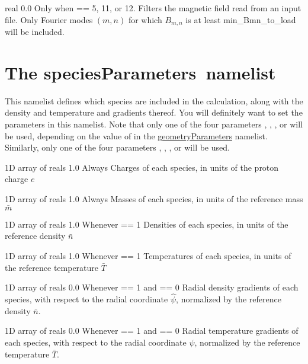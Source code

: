 {real}
{0.0}
{Only when  == 5, 11, or 12.}
{Filters the magnetic field read from an input file.  Only Fourier modes $(m,n)$ for which $B_{m,n}$ is at least {\ttfamily min\_Bmn\_to\_load} will be included.}




\section{The {\ttfamily speciesParameters}~namelist}

This namelist defines which species are included in the calculation, along with the density and temperature and gradients thereof.
You will definitely want to set the parameters in this namelist.
Note that only one of the four parameters 
, 
, 
, or
will be used, depending on the value of 
in the {\ttfamily \hyperref[sec:geometryParameters]{geometryParameters}} namelist.
Similarly, only one of the four parameters
, 
, 
, or
will be used.

\myhrule

{1D array of reals}
{1.0}
{Always}
{Charges of each species, in units of the proton charge $e$}

\myhrule

{1D array of reals}
{1.0}
{Always}
{Masses of each species, in units of the reference mass $\bar{m}$}

\myhrule

{1D array of reals}
{1.0}
{Whenever  == 1}
{Densities of each species, in units of the reference density $\bar{n}$}

\myhrule

{1D array of reals}
{1.0}
{Whenever  == 1}
{Temperatures of each species, in units of the reference temperature $\bar{T}$}

\myhrule

{1D array of reals}
{0.0}
{Whenever  == 1 and  == 0}
{Radial density gradients of each species, with respect to the radial coordinate $\hat{\psi}$, normalized by the reference density $\bar{n}$.}

\myhrule

{1D array of reals}
{0.0}
{Whenever  == 1 and  == 0}
{Radial temperature gradients of each species, with respect to the radial coordinate $\hat{\psi}$, normalized by the reference temperature $\bar{T}$.}

